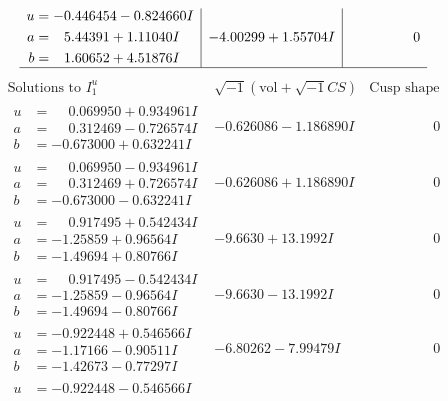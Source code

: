 \documentclass[1p]{elsarticle_modified}
\theoremstyle{definition}
\newcommand{\I}{\sqrt{-1}}
\begin{document}
$$\begin{array}{c|c|c}
\begin{aligned}
u &= -0.446454 - 0.824660 I \\
a &= \phantom{-}5.44391 + 1.11040 I \\
b &= \phantom{-}1.60652 + 4.51876 I\end{aligned}
 & -4.00299 + 1.55704 I & \phantom{-0.000000 } 0\\
 \hline 
 \end{array}$$\newpage$$\begin{array}{c|c|c}  
\text{Solutions to }I^u_{1}& \I (\text{vol} + \sqrt{-1}CS) & \text{Cusp shape}\\
 \hline 
\begin{aligned}
u &= \phantom{-}0.069950 + 0.934961 I \\
a &= \phantom{-}0.312469 - 0.726574 I \\
b &= -0.673000 + 0.632241 I\end{aligned}
 & -0.626086 - 1.186890 I & \phantom{-0.000000 } 0 \\ \hline\begin{aligned}
u &= \phantom{-}0.069950 - 0.934961 I \\
a &= \phantom{-}0.312469 + 0.726574 I \\
b &= -0.673000 - 0.632241 I\end{aligned}
 & -0.626086 + 1.186890 I & \phantom{-0.000000 } 0 \\ \hline\begin{aligned}
u &= \phantom{-}0.917495 + 0.542434 I \\
a &= -1.25859 + 0.96564 I \\
b &= -1.49694 + 0.80766 I\end{aligned}
 & -9.6630 + 13.1992 I & \phantom{-0.000000 } 0 \\ \hline\begin{aligned}
u &= \phantom{-}0.917495 - 0.542434 I \\
a &= -1.25859 - 0.96564 I \\
b &= -1.49694 - 0.80766 I\end{aligned}
 & -9.6630 - 13.1992 I & \phantom{-0.000000 } 0 \\ \hline\begin{aligned}
u &= -0.922448 + 0.546566 I \\
a &= -1.17166 - 0.90511 I \\
b &= -1.42673 - 0.77297 I\end{aligned}
 & -6.80262 - 7.99479 I & \phantom{-0.000000 } 0 \\ \hline\begin{aligned}
u &= -0.922448 - 0.546566 I \\

\end{aligned}
\end{array}$$
\end{document}
